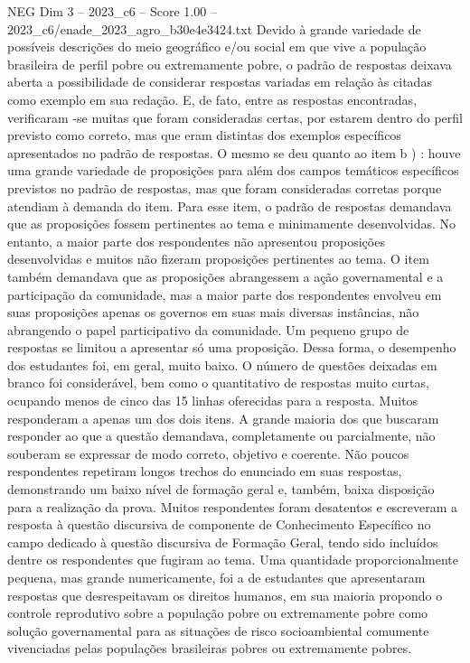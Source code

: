 \begin{textsample}{NEG Dim 3 – 2023\_c6 – Score 1.00 – 2023\_c6/enade\_2023\_agro\_b30e4e3424.txt}
Devido à grande variedade de possíveis descrições do meio geográfico e/ou social em que vive a população brasileira de perfil pobre ou extremamente pobre, o padrão de respostas deixava aberta a possibilidade de considerar respostas variadas em relação às citadas como exemplo em sua redação.
E, de fato, entre as respostas encontradas, verificaram -se muitas que foram consideradas certas, por estarem dentro do perfil previsto como correto, mas que eram distintas dos exemplos específicos apresentados no padrão de respostas.
O mesmo se deu quanto ao item b ) : houve uma grande variedade de proposições para além dos campos temáticos específicos previstos no padrão de respostas, mas que foram consideradas corretas porque atendiam à demanda do item.
Para esse item, o padrão de respostas demandava que as proposições fossem pertinentes ao tema e minimamente desenvolvidas.
No entanto, a maior parte dos respondentes não apresentou proposições desenvolvidas e muitos não fizeram proposições pertinentes ao tema.
O item também demandava que as proposições abrangessem a ação governamental e a participação da comunidade, mas a maior parte dos respondentes envolveu em suas proposições apenas os governos em suas mais diversas instâncias, não abrangendo o papel participativo da comunidade.
Um pequeno grupo de respostas se limitou a apresentar só uma proposição.
Dessa forma, o desempenho dos estudantes foi, em geral, muito baixo.
O número de questões deixadas em branco foi considerável, bem como o quantitativo de respostas muito curtas, ocupando menos de cinco das 15 linhas oferecidas para a resposta.
Muitos responderam a apenas um dos dois itens.
A grande maioria dos que buscaram responder ao que a questão demandava, completamente ou parcialmente, não souberam se expressar de modo correto, objetivo e coerente.
Não poucos respondentes repetiram longos trechos do enunciado em suas respostas, demonstrando um baixo nível de formação geral e, também, baixa disposição para a realização da prova.
Muitos respondentes foram desatentos e escreveram a resposta à questão discursiva de componente de Conhecimento Específico no campo dedicado à questão discursiva de Formação Geral, tendo sido incluídos dentre os respondentes que fugiram ao tema.
Uma quantidade proporcionalmente pequena, mas grande numericamente, foi a de estudantes que apresentaram respostas que desrespeitavam os direitos humanos, em sua maioria propondo o controle reprodutivo sobre a população pobre ou extremamente pobre como solução governamental para as situações de risco socioambiental comumente vivenciadas pelas populações brasileiras pobres ou extremamente pobres.

\end{textsample}
